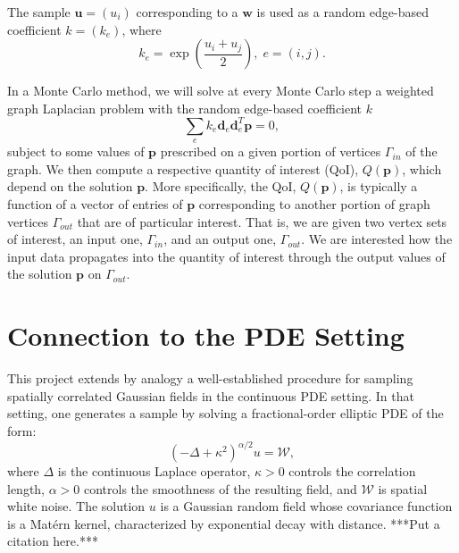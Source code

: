\documentclass[a4paper,12pt]{amsart}
\numberwithin{equation}{section}
\def\bu{{\mathbf u}}
\def\bw{{\mathbf w}}
\def\bd{{\mathbf d}}
\def\bp{{\mathbf p}}
\begin{document}
The sample $\bu =(u_i)$ corresponding to a $\bw$ is used as a random 
edge-based coefficient $k = (k_e)$, where 
\begin{equation}\label{random coefficient}
k_e = \exp\left({\frac{u_i+u_j}{2}}\right),\; e = (i,j).
\end{equation}

In a Monte Carlo method, we will solve at every Monte Carlo step a weighted 
graph Laplacian problem with the random edge-based coefficient $k$
\begin{equation}\label{weighted graph Laplacian problem}
\sum\limits_e k_e \bd_e \bd^T_e \bp = 0,
\end{equation}
subject to some values of $\bp$ prescribed on a given portion of vertices 
$\Gamma_{in}$ of the graph. We then compute a respective quantity of interest
(QoI), $Q(\bp)$, which depend on the solution $\bp$. More specifically, the 
QoI, $Q(\bp)$, is typically a function of a vector of entries of $\bp$ 
corresponding to another portion of graph vertices $\Gamma_{out}$ that are 
of particular interest. That is, we are given two vertex sets of interest, 
an input one, $\Gamma_{in}$, and an output one, $\Gamma_{out}$. We are 
interested how the input data propagates into the quantity of interest 
through the output values of the solution $\bp$ on $\Gamma_{out}$.

\section{Connection to the PDE Setting}

This project extends by analogy a well-established procedure for sampling 
spatially correlated Gaussian fields in the continuous PDE setting. In that 
setting, one generates a sample by solving a fractional-order elliptic PDE 
of the form:
\begin{equation}
(-\Delta + \kappa^2)^{\alpha/2} u = \mathcal{W},
\end{equation}
where $\Delta$ is the continuous Laplace operator, $\kappa > 0$ controls 
the correlation length, $\alpha > 0$ controls the smoothness of the 
resulting field, and $\mathcal{W}$ is spatial white noise. The solution 
$u$ is a Gaussian random field whose covariance function is a Mat\'ern 
kernel, characterized by exponential decay with distance. ***Put a citation here.***
\end{document}
